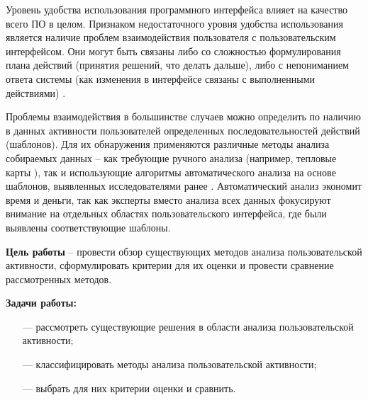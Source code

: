 
Уровень удобства использования программного интерфейса влияет на качество всего ПО в целом. Признаком недостаточного уровня удобства использования является наличие проблем взаимодействия пользователя с пользовательским интерфейсом. Они могут быть связаны либо со сложностью формулирования плана действий (принятия решений, что делать дальше), либо с непониманием ответа системы (как изменения в интерфейсе связаны с выполненными действиями) \cite{1}.

Проблемы взаимодействия в большинстве случаев можно определить по наличию в данных активности пользователей определенных последовательностей действий (шаблонов). Для их обнаружения применяются различные методы анализа собираемых данных – как требующие ручного анализа (например, тепловые карты \cite{2,3}), так и использующие алгоритмы автоматического анализа \cite{1} на основе шаблонов, выявленных исследователями ранее \cite{4, 5, 6}. Автоматический анализ экономит время и деньги, так как эксперты вместо анализа всех данных фокусируют внимание на отдельных областях пользовательского интерфейса,
где были выявлены соответствующие шаблоны.


\textbf{Цель работы} – провести обзор существующих методов анализа пользовательской активности, сформулировать критерии для их оценки и провести сравнение рассмотренных методов.

\textbf{Задачи работы:}
\begin{itemize}
	\item[---] рассмотреть существующие решения в области анализа пользовательской активности;
	\item[---] классифицировать методы анализа пользовательской активности;
	\item[---] выбрать для них критерии оценки и сравнить.
\end{itemize}
